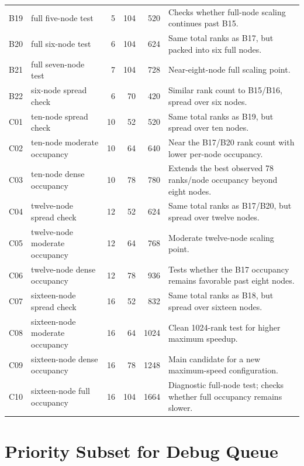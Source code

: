 \documentclass[11pt]{article}
\begin{document}
\begin{longtable}{l>{\raggedright\arraybackslash}p{1.25in}rrr>{\raggedright\arraybackslash}p{2.05in}}
B19 & full five-node test & 5 & 104 & 520 & Checks whether full-node scaling continues past B15. \\
B20 & full six-node test & 6 & 104 & 624 & Same total ranks as B17, but packed into six full nodes. \\
B21 & full seven-node test & 7 & 104 & 728 & Near-eight-node full scaling point. \\
B22 & six-node spread check & 6 & 70 & 420 & Similar rank count to B15/B16, spread over six nodes. \\
C01 & ten-node spread check & 10 & 52 & 520 & Same total ranks as B19, but spread over ten nodes. \\
C02 & ten-node moderate occupancy & 10 & 64 & 640 & Near the B17/B20 rank count with lower per-node occupancy. \\
C03 & ten-node dense occupancy & 10 & 78 & 780 & Extends the best observed 78 ranks/node occupancy beyond eight nodes. \\
C04 & twelve-node spread check & 12 & 52 & 624 & Same total ranks as B17/B20, but spread over twelve nodes. \\
C05 & twelve-node moderate occupancy & 12 & 64 & 768 & Moderate twelve-node scaling point. \\
C06 & twelve-node dense occupancy & 12 & 78 & 936 & Tests whether the B17 occupancy remains favorable past eight nodes. \\
C07 & sixteen-node spread check & 16 & 52 & 832 & Same total ranks as B18, but spread over sixteen nodes. \\
C08 & sixteen-node moderate occupancy & 16 & 64 & 1024 & Clean 1024-rank test for higher maximum speedup. \\
C09 & sixteen-node dense occupancy & 16 & 78 & 1248 & Main candidate for a new maximum-speed configuration. \\
C10 & sixteen-node full occupancy & 16 & 104 & 1664 & Diagnostic full-node test; checks whether full occupancy remains slower. \\
\end{longtable}
\normalsize

\section*{Priority Subset for Debug Queue}
\end{document}
